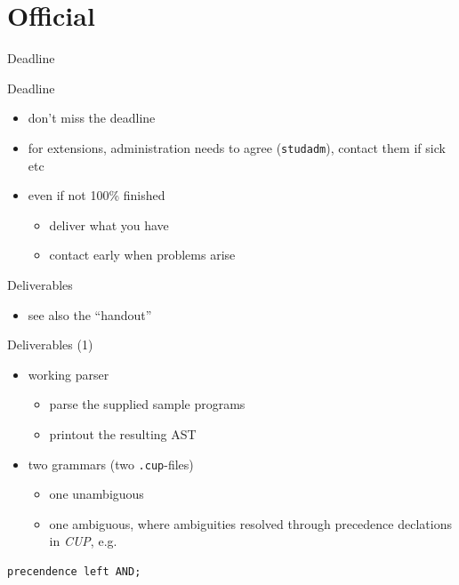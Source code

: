 \documentclass{beamer}
\begin{document}
\section{Official}
\label{sec:org68d4a96}

\begin{frame}[label={sec:org1022d07},fragile]{Deadline}
 \begin{alertblock}{Deadline}
   \alert{\deadlineone}
\end{alertblock}
\begin{itemize}
\item don't miss the deadline
\item for extensions, administration needs to agree (\texttt{studadm}), contact them
if sick etc
\item even if not 100\% finished
\begin{itemize}
\item deliver what you have
\item contact early when problems arise
\end{itemize}
\end{itemize}
\end{frame}
\begin{frame}[label={sec:org55566f6},fragile]{Deliverables}
 \begin{itemize}
\item see also the ``handout''
\end{itemize}
\begin{block}{Deliverables (1)}
\begin{itemize}
\item working \alert{parser}
\begin{itemize}
\item parse the supplied sample programs
\item printout the resulting AST
\end{itemize}

\item \alert{two} grammars (two \texttt{.cup}-files)

\begin{itemize}
\item one unambiguous
\item one ambiguous, where ambiguities resolved through precedence
declations in \emph{CUP}, e.g.
\end{itemize}
\end{itemize}

\begin{verbatim}
precendence left AND;
\end{verbatim}
\end{block}
\end{frame}
\end{document}
